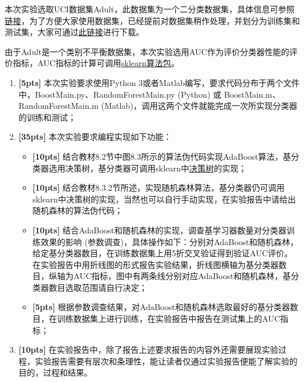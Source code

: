 \documentclass[a4paper,UTF8]{article}
\numberwithin{equation}{section}
\begin{document}
本次实验选取UCI数据集Adult，此数据集为一个二分类数据集，具体信息可参照\href{http://archive.ics.uci.edu/ml/datasets/Adult}{链接}，为了方便大家使用数据集，已经提前对数据集稍作处理，并划分为训练集和测试集，大家可通过\href{ftp://lamda.nju.edu.cn/ml2018/PS5/adult_dataset.zip}{此链接}进行下载。

由于Adult是一个类别不平衡数据集，本次实验选用AUC作为评价分类器性能的评价指标，AUC指标的计算可调用\href{http://scikit-learn.org/stable/modules/generated/sklearn.metrics.roc_auc_score.html}{sklearn算法包}。

\begin{enumerate}[(1)]
	\item \textbf{[5pts]} 本次实验要求使用Python 3或者Matlab编写，要求代码分布于两个文件中，BoostMain.py、RandomForestMain.py (Python) 或 BoostMain.m、RandomForestMain.m (Matlab)，调用这两个文件就能完成一次所实现分类器的训练和测试；
	
	\item \textbf{[35pts]} 本次实验要求编程实现如下功能：
	
	\begin{itemize}
		\item \textbf{[10pts]} 结合教材8.2节中图8.3所示的算法伪代码实现AdaBoost算法，基分类器选用决策树，基分类器可调用sklearn中\href{http://scikit-learn.org/stable/modules/generated/sklearn.tree.DecisionTreeClassifier.html}{决策树}的实现；
		\item \textbf{[10pts]} 结合教材8.3.2节所述，实现随机森林算法，基分类器仍可调用sklearn中决策树的实现，当然也可以自行手动实现，在实验报告中请给出随机森林的算法伪代码；
		\item \textbf{[10pts]} 结合AdaBoost和随机森林的实现，调查基学习器数量对分类器训练效果的影响 (参数调查)，具体操作如下：分别对AdaBoost和随机森林，给定基分类器数目，在训练数据集上用5折交叉验证得到验证AUC评价。在实验报告中用折线图的形式报告实验结果，折线图横轴为基分类器数目，纵轴为AUC指标，图中有两条线分别对应AdaBoost和随机森林，基分类器数目选取范围请自行决定；
		\item \textbf{[5pts]} 根据参数调查结果，对AdaBoost和随机森林选取最好的基分类器数目，在训练数据集上进行训练，在实验报告中报告在测试集上的AUC指标；
	\end{itemize}
	
	\item \textbf{[10pts]} 在实验报告中，除了报告上述要求报告的内容外还需要展现实验过程，实验报告需要有层次和条理性，能让读者仅通过实验报告便能了解实验的目的，过程和结果。
	
\end{enumerate}

	
\end{document}
